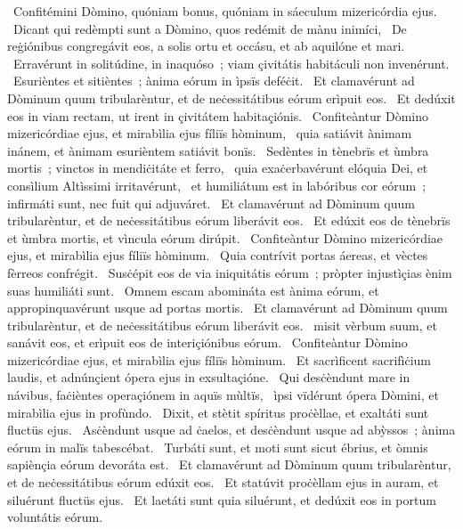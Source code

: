 ~Confitémini Dòmino, quóniam bonus, quóniam in sáeculum mizericórdia ejus. 
~Dicant qui redèmpti sunt a Dòmino, quos redémit de mànu inimíci, 
~De reġiónibus congregávit eos, a solis ortu et occásu, et ab aquilóne et mari. 
~Erravérunt in solitúdine, in inaquóso~; viam çivitátis habitáculi non invenérunt. 
~Esurièntes et sitièntes~; ànima eórum in ìpsïs deféċit. 
~Et clamavérunt ad Dòminum quum tribularèntur, et de neċessitátibus eórum erìpuit eos. 
~Et dedúxit eos in viam rectam, ut irent in çivitátem habitaçiónis. 
~Confiteàntur Dòmino mizericórdiae ejus, et mirabìlia ejus fíliïs hòminum, 
~quia satiávit ànimam inánem, et ànimam esurièntem satiávit bonïs. 
~Sedèntes in tènebrïs et ùmbra mortis~; vinctos in mendiċitáte et ferro, 
~quia exaċerbavérunt elóquia Dei, et consìlium Altìssimi irritavérunt, 
~et humiliátum est in labóribus cor eórum~; infirmáti sunt, nec fuit qui adjuváret. 
~Et clamavérunt ad Dòminum quum tribularèntur, et de neċessitátibus eórum liberávit eos. 
~Et edúxit eos de tènebrïs et ùmbra mortis, et vìncula eórum dirúpit. 
~Confiteàntur Dòmino mizericórdiae ejus, et mirabìlia ejus fíliïs hòminum. 
~Quia contrívit portas áereas, et vèctes fèrreos confrégit. 
~Susċépit eos de via iniquitátis eórum~; pròpter injustìçias ènim suas humiliáti sunt. 
~Omnem escam abomináta est ànima eórum, et appropinquavérunt usque ad portas mortis. 
~Et clamavérunt ad Dòminum quum tribularèntur, et de neċessitátibus eórum liberávit eos. 
~misit vèrbum suum, et sanávit eos, et erìpuit eos de interiçiónibus eórum. 
~Confiteàntur Dòmino mizericórdiae ejus, et mirabìlia ejus fíliïs hòminum. 
~Et sacrìficent sacrifìċium laudis, et adnúnçient ópera ejus in exsultaçióne. 
~Qui desċèndunt mare in návibus, faċièntes operaçiónem in aquïs mùltïs, 
~ìpsi vïdérunt ópera Dòmini, et mirabìlia ejus in profùndo. 
~Dixit, et stètit spíritus proċèllae, et exaltáti sunt fluctüs ejus. 
~Asċèndunt usque ad ċaelos, et desċèndunt usque ad abỳssos~; ànima eórum in malïs tabescébat. 
~Turbáti sunt, et moti sunt sicut ébrius, et òmnis sapiènçia eórum devoráta est. 
~Et clamavérunt ad Dòminum quum tribularèntur, et de neċessitátibus eórum edúxit eos. 
~Et statúvit proċèllam ejus in auram, et siluérunt fluctüs ejus. 
~Et laetáti sunt quia siluérunt, et dedúxit eos in portum voluntátis eórum. 
